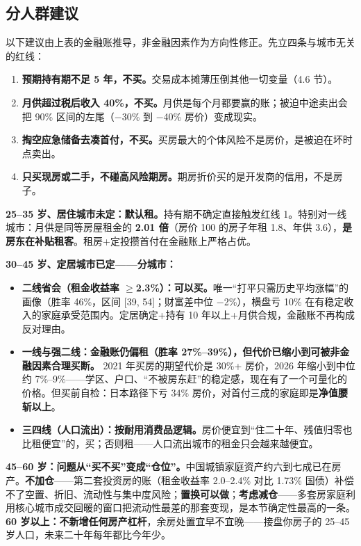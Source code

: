 \documentclass[11pt,a4paper]{ctexart}
\begin{document}
\subsection{分人群建议}

以下建议由上表的金融账推导，非金融因素作为方向性修正。先立四条与城市无关的红线：

\begin{enumerate}\itemsep0.2em
\item \textbf{预期持有期不足 5 年，不买。}交易成本摊薄压倒其他一切变量（4.6 节）。
\item \textbf{月供超过税后收入 40\%，不买。}月供是每个月都要赢的账；被迫中途卖出会把 90\% 区间的左尾（$-$30\% 到 $-$40\% 房价）变成现实。
\item \textbf{掏空应急储备去凑首付，不买。}买房最大的个体风险不是房价，是被迫在坏时点卖出。
\item \textbf{只买现房或二手，不碰高风险期房。}期房折价买的是开发商的信用，不是房子。
\end{enumerate}

\textbf{25--35 岁、居住城市未定：默认租。}持有期不确定直接触发红线 1。特别对一线城市：月供是同等房屋租金的 \textbf{2.01 倍}（房价 100 的房子年租 1.8、年供 3.6），\textbf{是房东在补贴租客}。租房+定投攒首付在金融账上严格占优。

\textbf{30--45 岁、定居城市已定——分城市：}
\begin{itemize}\itemsep0.2em
\item \textbf{二线省会（租金收益率 $\geq$2.3\%）：可以买。}唯一``打平只需历史平均涨幅''的画像（胜率 46\%，区间 [39, 54]；财富差中位 $-$2\%），横盘亏 10\% 在有稳定收入的家庭承受范围内。定居确定+持有 10 年以上+月供合规，金融账不再构成反对理由。
\item \textbf{一线与强二线：金融账仍偏租（胜率 27\%--39\%），但代价已缩小到可被非金融因素合理买断。} 2021 年买房的期望代价是 30\%+ 房价，2026 年缩小到中位约 7\%--9\%——学区、户口、``不被房东赶''的稳定感，现在有了一个可量化的价格。但买前自检：日本路径下亏 34\% 房价，对首付三成的家庭即是\textbf{净值腰斩以上}。
\item \textbf{三四线（人口流出）：按耐用消费品逻辑。}房价便宜到``住二十年、残值归零也比租便宜''的，买；否则租——人口流出城市的租金只会越来越便宜。
\end{itemize}

\textbf{45--60 岁：问题从``买不买''变成``仓位''。}中国城镇家庭资产约六到七成已在房产。\textbf{不加仓}——第二套投资房的账（租金收益率 2.0--2.4\% 对比 1.73\% 国债）补偿不了空置、折旧、流动性与集中度风险；\textbf{置换可以做}；\textbf{考虑减仓}——多套房家庭利用核心城市成交回暖的窗口把流动性最差的那套变现，是本节确定性最高的一条。\textbf{60 岁以上：不新增任何房产杠杆}，余房处置宜早不宜晚——接盘你房子的 25--45 岁人口，未来二十年每年都比今年少。
\end{document}
